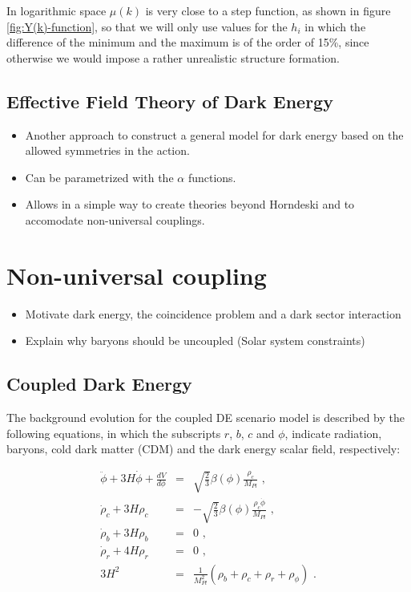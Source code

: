 In logarithmic space $\mu(k)$ is very close to a step function, as
shown in figure \ref{fig:Y(k)-function}, so that we will only use
values for the $h_{i}$ in which the difference of the minimum and
the maximum is of the order of 15\%, since otherwise we would impose
a rather unrealistic structure formation.


\subsection{Effective Field Theory of Dark Energy}
\begin{itemize}
\item Another approach to construct a general model for dark energy based
on the allowed symmetries in the action.
\item Can be parametrized with the $\alpha$ functions.
\item Allows in a simple way to create theories beyond Horndeski and to
accomodate non-universal couplings.
\end{itemize}

\section{Non-universal coupling}

\begin{itemize}
\item Motivate dark energy, the coincidence problem and a dark sector interaction
\item Explain why baryons should be uncoupled (Solar system constraints)
\end{itemize}

\subsection{Coupled Dark Energy}

The background evolution for the coupled DE scenario model is described
by the following equations, in which the subscripts $r$, $b$, $c$
and $\phi$, indicate radiation, baryons, cold dark matter (CDM) and
the dark energy scalar field, respectively:

\begin{eqnarray}
\ddot{\phi}+3H\dot{\phi}+\frac{dV}{d\phi} & = & \sqrt{\frac{2}{3}}\beta(\phi)\frac{\rho_{c}}{M_{Pl}}\,\,,\label{eq:quint-kleingordon}\\
\dot{\rho}_{c}+3H\rho_{c} & = & -\sqrt{\frac{2}{3}}\beta(\phi)\frac{\rho_{c}\dot{\phi}}{M_{Pl}}\,\,,\label{eq:cdm-back-density}\\
\dot{\rho}_{b}+3H\rho_{b} & = & 0\,\,,\\
\dot{\rho}_{r}+4H\rho_{r} & = & 0\,\,,\\
3H^{2} & = & \frac{1}{M_{Pl}^{2}}(\rho_{b}+\rho_{c}+\rho_{r}+\rho_{\phi})\,\,.
\end{eqnarray}


